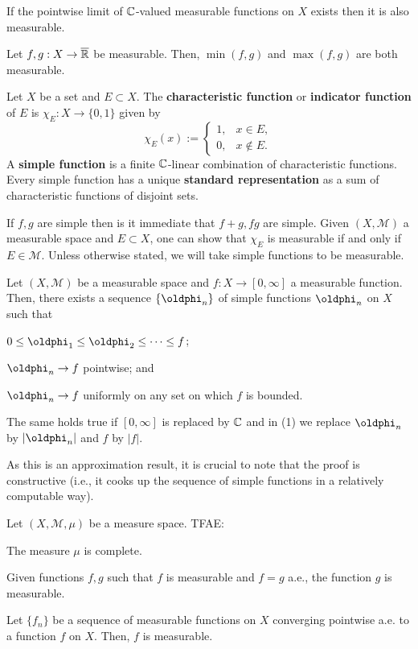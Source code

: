 \documentclass[11pt]{article}
\newcommand{\M}{\mathcal{M}}
\renewcommand{\phi}{\oldphi}
\begin{document}
If the pointwise limit of $\mathbb{C}$-valued measurable functions on $X$ exists then it is also measurable.

\begin{corollary}
Let $f,g: X\to\overline{\mathbb{R}}$ be measurable. Then, $\min(f,g)$ and $\max(f,g)$ are both measurable.
\end{corollary}

\begin{definition}
Let $X$ be a set and $E\subset X$. The \textbf{characteristic function} or \textbf{indicator function} of $E$ is $\chi_E: X\to\{0,1\}$ given by
\begin{equation*}
\chi_E(x):=
\begin{cases}
1, & x\in E, \\
0, & x\not\in E.
\end{cases}
\end{equation*}
A \textbf{simple function} is a finite $\mathbb{C}$-linear combination of characteristic functions. Every simple function has a unique \textbf{standard representation} as a sum of characteristic functions of disjoint sets.
\end{definition}

If $f,g$ are simple then is it immediate that $f+g,fg$ are simple. Given $(X,\M)$ a measurable space and $E\subset X$, one can show that $\chi_E$ is measurable if and only if $E\in\M$. Unless otherwise stated, we will take simple functions to be measurable.

\begin{theorem}\label{increasing_simple_approximation}
Let $(X,\M)$ be a measurable space and $f: X\to[0,\infty]$ a measurable function. Then, there exists a sequence $\{\phi_n\}$ of simple functions $\phi_n$ on $X$ such that
\begin{enum}{\arabic}
\item $0\leq\phi_1\leq\phi_2\leq\cdots\leq f$;
\item $\phi_n\to f$ pointwise; and
\item $\phi_n\to f$ uniformly on any set on which $f$ is bounded.
\end{enum}
The same holds true if $[0,\infty]$ is replaced by $\mathbb{C}$ and in \textup{(1)} we replace $\phi_n$ by $|\phi_n|$ and $f$ by $|f|$.
\end{theorem}

As this is an approximation result, it is crucial to note that the proof is constructive (i.e., it cooks up the sequence of simple functions in a relatively computable way).

\begin{proposition}
Let $(X,\M,\mu)$ be a measure space. TFAE:
\begin{enum}{\roman}
\item The measure $\mu$ is complete.
\item Given functions $f,g$ such that $f$ is measurable and $f=g$ a.e., the function $g$ is measurable.
\item Let $\{f_n\}$ be a sequence of measurable functions on $X$ converging pointwise a.e. to a function $f$ on $X$. Then, $f$ is measurable.
\end{enum}
\end{proposition}
\end{document}
